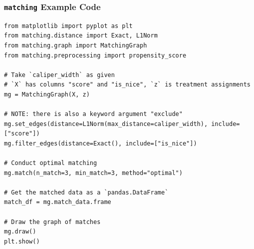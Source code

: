\documentclass[11pt, compress]{beamer}
\begin{document}
\begin{frame}[fragile]
\frametitle{\texttt{matching} Example Code}
\begin{verbatim}
from matplotlib import pyplot as plt
from matching.distance import Exact, L1Norm
from matching.graph import MatchingGraph
from matching.preprocessing import propensity_score

# Take `caliper_width` as given
# `X` has columns "score" and "is_nice", `z` is treatment assignments
mg = MatchingGraph(X, z)

# NOTE: there is also a keyword argument "exclude"
mg.set_edges(distance=L1Norm(max_distance=caliper_width), include=["score"])
mg.filter_edges(distance=Exact(), include=["is_nice"])

# Conduct optimal matching
mg.match(n_match=3, min_match=3, method="optimal")

# Get the matched data as a `pandas.DataFrame`
match_df = mg.match_data.frame

# Draw the graph of matches
mg.draw()
plt.show()
\end{verbatim}
\end{frame}

\end{document}
